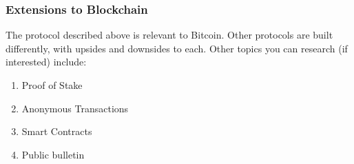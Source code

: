 
\subsubsection{Extensions to Blockchain}
The protocol described above is relevant to Bitcoin. Other protocols are built differently, with upsides and downsides to each. Other topics you can research (if interested) include:
\begin{enumerate}
    \item Proof of Stake
    \item Anonymous Transactions
    \item Smart Contracts
    \item Public bulletin
\end{enumerate}
